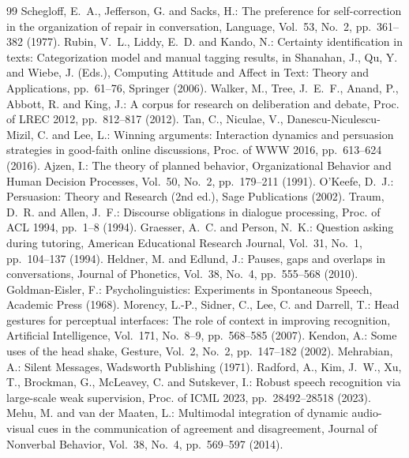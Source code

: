 \documentclass[Japanese]{dicomopapers}
\begin{document}
\begin{thebibliography}{99}
Schegloff, E.~A., Jefferson, G. and Sacks, H.: The preference for self-correction in the organization of repair in conversation, Language, Vol.~53, No.~2, pp.~361--382 (1977).
Rubin, V.~L., Liddy, E.~D. and Kando, N.: Certainty identification in texts: Categorization model and manual tagging results, in Shanahan, J., Qu, Y. and Wiebe, J. (Eds.), Computing Attitude and Affect in Text: Theory and Applications, pp.~61--76, Springer (2006).
Walker, M., Tree, J.~E.~F., Anand, P., Abbott, R. and King, J.: A corpus for research on deliberation and debate, Proc. of LREC 2012, pp.~812--817 (2012).
Tan, C., Niculae, V., Danescu-Niculescu-Mizil, C. and Lee, L.: Winning arguments: Interaction dynamics and persuasion strategies in good-faith online discussions, Proc. of WWW 2016, pp.~613--624 (2016).
Ajzen, I.: The theory of planned behavior, Organizational Behavior and Human Decision Processes, Vol.~50, No.~2, pp.~179--211 (1991).
O'Keefe, D.~J.: Persuasion: Theory and Research (2nd ed.), Sage Publications (2002).
Traum, D.~R. and Allen, J.~F.: Discourse obligations in dialogue processing, Proc. of ACL 1994, pp.~1--8 (1994).
Graesser, A.~C. and Person, N.~K.: Question asking during tutoring, American Educational Research Journal, Vol.~31, No.~1, pp.~104--137 (1994).
Heldner, M. and Edlund, J.: Pauses, gaps and overlaps in conversations, Journal of Phonetics, Vol.~38, No.~4, pp.~555--568 (2010).
Goldman-Eisler, F.: Psycholinguistics: Experiments in Spontaneous Speech, Academic Press (1968).
Morency, L.-P., Sidner, C., Lee, C. and Darrell, T.: Head gestures for perceptual interfaces: The role of context in improving recognition, Artificial Intelligence, Vol.~171, No.~8--9, pp.~568--585 (2007).
Kendon, A.: Some uses of the head shake, Gesture, Vol.~2, No.~2, pp.~147--182 (2002).
Mehrabian, A.: Silent Messages, Wadsworth Publishing (1971).
Radford, A., Kim, J.~W., Xu, T., Brockman, G., McLeavey, C. and Sutskever, I.: Robust speech recognition via large-scale weak supervision, Proc. of ICML 2023, pp.~28492--28518 (2023).
Mehu, M. and van der Maaten, L.: Multimodal integration of dynamic audio-visual cues in the communication of agreement and disagreement, Journal of Nonverbal Behavior, Vol.~38, No.~4, pp.~569--597 (2014).
\end{thebibliography}
\end{document}
